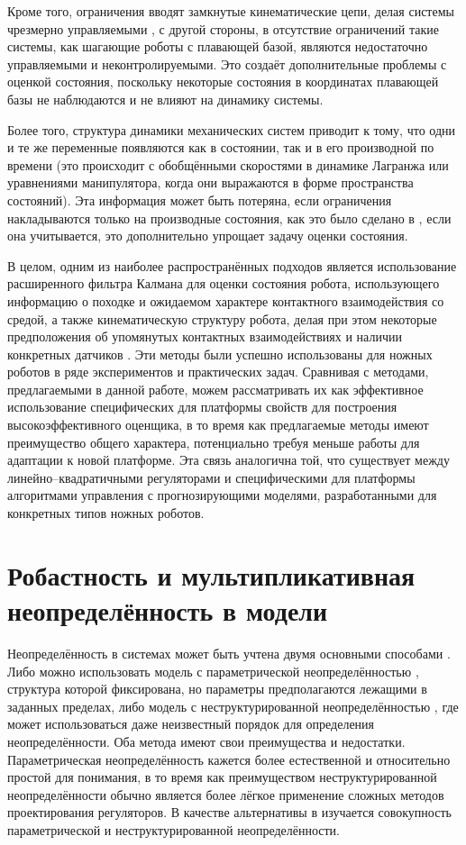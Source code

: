 Кроме того, ограничения вводят замкнутые кинематические цепи, делая системы чрезмерно управляемыми \cite{Furieri2017}, с другой стороны, в отсутствие ограничений такие системы, как шагающие роботы с плавающей базой, являются недостаточно управляемыми и неконтролируемыми. Это создаёт дополнительные проблемы с оценкой состояния, поскольку некоторые состояния в координатах плавающей базы не наблюдаются и не влияют на динамику системы. 

Более того, структура динамики механических систем приводит к тому, что одни и те же переменные появляются как в состоянии, так и в его производной по времени (это происходит с обобщёнными скоростями в динамике Лагранжа или уравнениями манипулятора, когда они выражаются в форме пространства состояний). Эта информация может быть потеряна, если ограничения накладываются только на производные состояния, как это было сделано в \cite{Mason2017}, если она учитывается, это дополнительно упрощает задачу оценки состояния.

В целом, одним из наиболее распространённых подходов является использование расширенного фильтра Калмана для оценки состояния робота, использующего информацию о походке и ожидаемом характере контактного взаимодействия со средой, а также кинематическую структуру робота, делая при этом некоторые предположения об упомянутых контактных взаимодействиях и наличии конкретных датчиков \cite{Bloesch2012, Teng2021}. Эти методы были успешно использованы для ножных роботов в ряде экспериментов и практических задач. Сравнивая с методами, предлагаемыми в данной работе, можем рассматривать их как эффективное использование специфических для платформы свойств для построения высокоэффективного оценщика, в то время как предлагаемые методы имеют преимущество общего характера, потенциально требуя меньше работы для адаптации к новой платформе. Эта связь аналогична той, что существует между линейно--квадратичными регуляторами и специфическими для платформы алгоритмами управления с прогнозирующими моделями, разработанными для конкретных типов ножных роботов.

\section{Робастность и мультипликативная неопределённость в модели}\label{sec:ch1/sec5}

Неопределённость в системах может быть учтена двумя основными способами \cite{Radek2017}. Либо можно использовать модель с параметрической неопределённостью \cite{barmish1994new, Bhattacharyya2009}, структура которой фиксирована, но параметры предполагаются лежащими в заданных пределах, либо модель с неструктурированной неопределённостью \cite{Doyle2009, Kucera2007}, где может использоваться даже неизвестный порядок для определения неопределённости. Оба метода имеют свои преимущества и недостатки. Параметрическая неопределённость кажется более естественной и относительно простой для понимания, в то время как преимуществом неструктурированной неопределённости обычно является более лёгкое применение сложных методов проектирования регуляторов. В качестве альтернативы в \cite{Tan2003} изучается совокупность параметрической и неструктурированной неопределённости.

